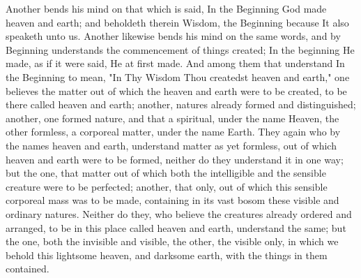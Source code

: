 \documentclass[b5paper,openright,12pt,twoside]{book}
\begin{document}
Another bends his mind on that which is said, In the Beginning God made
heaven and earth; and beholdeth therein Wisdom, the Beginning because
It also speaketh unto us. Another likewise bends his mind on the same
words, and by Beginning understands the commencement of things created;
In the beginning He made, as if it were said, He at first made. And
among them that understand In the Beginning to mean, "In Thy Wisdom Thou
createdst heaven and earth," one believes the matter out of which the
heaven and earth were to be created, to be there called heaven and
earth; another, natures already formed and distinguished; another, one
formed nature, and that a spiritual, under the name Heaven, the other
formless, a corporeal matter, under the name Earth. They again who by
the names heaven and earth, understand matter as yet formless, out of
which heaven and earth were to be formed, neither do they understand it
in one way; but the one, that matter out of which both the intelligible
and the sensible creature were to be perfected; another, that only, out
of which this sensible corporeal mass was to be made, containing in
its vast bosom these visible and ordinary natures. Neither do they, who
believe the creatures already ordered and arranged, to be in this place
called heaven and earth, understand the same; but the one, both the
invisible and visible, the other, the visible only, in which we behold
this lightsome heaven, and darksome earth, with the things in them
contained.
\end{document}
